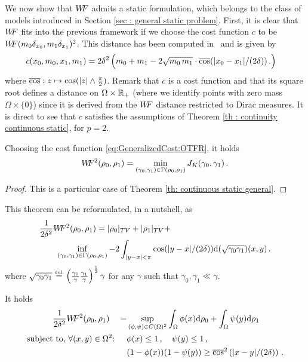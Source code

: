 We now show that $W\! \! F$ admits a static formulation, which belongs to the class of models introduced in Section \ref{sec : general static problem}. First, it is clear that $W\! \! F$ fits into the previous framework if we choose the cost function $c$ to be $W\! \! F(m_0 \delta_{x_0}, m_1 \delta_{x_1})^2$. This distance has been computed in~\cite{ChizatOTFR2015} and is given by
	\begin{align}
		\label{eq:GeneralizedCost:OTFR}
		c(x_0,m_0,x_1,m_1) & = 2 \delta^2 \left( \vphantom{\sum} m_0 + m_1 - 2\sqrt{m_0\,m_1} \cdot {\overline{\cos}}(|x_0-x_1|/(2 \delta))\, .
		\right) 
		\end{align}
where ${\overline{\cos}} : z \mapsto \cos(|z|\wedge \frac{\pi}{2})$.
Remark that $c$ is a cost function and that its square root defines a distance on $\Omega \times \mathbb{R}_+$ (where we identify points with zero mass $\Omega \times \{0\}$) since it is derived from the $W\! \! F$ distance restricted to Dirac measures. It is direct to see that $c$ satisfies the assumptions of Theorem \ref{th : continuity continuous static}, for $p=2$.
%
\begin{theorem}
\label{th: continuous static}
Choosing the cost function \eqref{eq:GeneralizedCost:OTFR}, it holds
\begin{equation}
\label{eq : continuous static}
W\! \! F^2(\rho_0,\rho_1) = \min_{(\gamma_0,\gamma_1) \in \Gamma(\rho_0,\rho_1)} J_K(\gamma_0,\gamma_1)\,.
\end{equation}
\end{theorem}
\begin{proof}
This is a particular case of Theorem \ref{th: continuous static general}.
\end{proof}
%
\begin{remark}
This theorem can be reformulated, in a nutshell, as
\begin{align*}
	& \frac{1}{2\delta^2} W\! \! F^2(\rho_0,\rho_1) 
		=  |\rho_0|_{TV} + |\rho_1|_{TV} + \\
		& \qquad \inf_{(\gamma_0,\gamma_1) \in \Gamma(\rho_0,\rho_1)} - 2 \int_{|y-x|<\pi} \cos(|y-x|/(2\delta)) \mathrm{d} (\sqrt{\gamma_0 \gamma_1})(x,y)  \, .
\end{align*}
where $\sqrt{\gamma_0\gamma_1} \stackrel{\mbox{\upshape\tiny def.}}{=} \left(\textstyle{\frac{\gamma_0}{\gamma}} \textstyle{\frac{\gamma_1}{\gamma}}\right)^\frac12 \gamma$ for any $\gamma$ such that $\gamma_0,\gamma_1 \ll \gamma$.
\end{remark}
%
\begin{corollary}
It holds
\begin{align*}
\label{eq : dual static}
\frac{1}{2\delta^2} W\! \! F^2(\rho_0,\rho_1) \quad =
& \sup_{(\phi,\psi)\in C(\Omega)^2  }  \int_\Omega \phi(x) \mathrm{d} \rho_0 + \int_\Omega \psi(y) \mathrm{d} \rho_1 \\
\textnormal{subject to, $\forall (x,y)\in \Omega^2$: }\quad
& \phi(x) \leq 1\,, \quad \psi(y) \leq 1\, , \\
&(1-\phi(x))(1-\psi(y)) \geq {\overline{\cos}}^2\left(|x-y|/(2\delta)\right)\, .
\end{align*}
\end{corollary}
